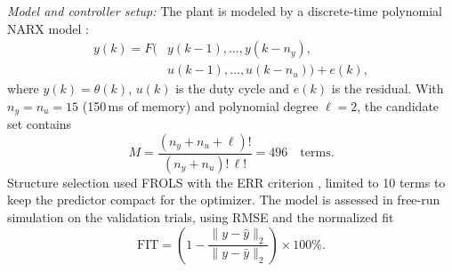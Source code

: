 \documentclass{ifacconf}
\begin{document}
\textit{Model and controller setup:} The plant is modeled by a discrete-time polynomial NARX model \citep{billings2013}:
\begin{equation}
\begin{aligned}
    y(k) = F\bigl(&y(k-1), \dots, y(k-n_y), \\
                  &u(k-1), \dots, u(k-n_u)\bigr) + e(k),
\end{aligned}
\label{eq:narx_general}
\end{equation}
where $y(k) = \theta(k)$, $u(k)$ is the duty cycle and $e(k)$ is the residual. With $n_y = n_u = 15$ (150\,ms of memory) and polynomial degree $\ell = 2$, the candidate set contains
\begin{equation}
    M = \frac{(n_y + n_u + \ell)!}{(n_y + n_u)!\,\ell!} = 496 \quad \text{terms}.
\end{equation}
Structure selection used FROLS with the ERR criterion \citep{chen1989,aguirre2015}, limited to 10 terms to keep the predictor compact for the optimizer. The model is assessed in free-run simulation on the validation trials, using RMSE and the normalized fit
\begin{equation}
    \mathrm{FIT} = \left(1 - \frac{\|y - \hat{y}\|_2}{\|y - \bar{y}\|_2}\right) \times 100\%.
\end{equation}
\end{document}

